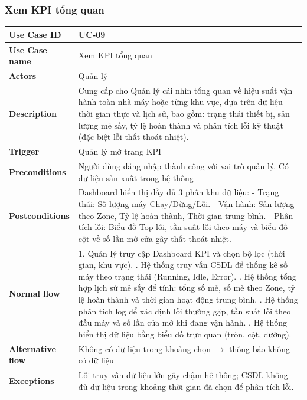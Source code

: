 \subsubsection{Xem KPI tổng quan}
\begin{tabular}{|p{3.5cm}|p{12.5cm}|}
\hline
\textbf{Use Case ID} & UC-09 \\
\hline
\textbf{Use Case name} & Xem KPI tổng quan \\
\hline
\textbf{Actors} & Quản lý \\
\hline
\textbf{Description} & 
Cung cấp cho Quản lý cái nhìn tổng quan về hiệu suất vận hành toàn nhà máy hoặc từng khu vực, dựa trên dữ liệu thời gian thực và lịch sử, bao gồm: trạng thái thiết bị, sản lượng mẻ sấy, tỷ lệ hoàn thành và phân tích lỗi kỹ thuật (đặc biệt lỗi thất thoát nhiệt). \\
\hline
\textbf{Trigger} & Quản lý mở trang KPI \\
\hline
\textbf{Preconditions} & Người dùng đăng nhập thành công với vai trò quản lý. Có dữ liệu sản xuất trong hệ thống \\
\hline
\textbf{Postconditions} & Dashboard hiển thị đầy đủ 3 phân khu dữ liệu:\newline
\hspace{1cm} - Trạng thái: Số lượng máy Chạy/Dừng/Lỗi.\newline
\hspace{1cm} - Vận hành: Sản lượng theo Zone, Tỷ lệ hoàn thành, Thời gian trung bình.\newline
\hspace{1cm}  - Phân tích lỗi: Biểu đồ Top lỗi, tần suất lỗi theo máy và biểu đồ cột về số lần mở cửa gây thất thoát nhiệt. \\
\hline
\textbf{Normal flow} & 
1. Quản lý truy cập Dashboard KPI và chọn bộ lọc (thời gian, khu vực). \newline
2. Hệ thống truy vấn CSDL để thống kê số máy theo trạng thái (Running, Idle, Error). \newline
3. Hệ thống tổng hợp lịch sử mẻ sấy để tính: tổng số mẻ, số mẻ theo Zone, tỷ lệ hoàn thành và thời gian hoạt động trung bình. \newline
4. Hệ thống phân tích log để xác định lỗi thường gặp, tần suất lỗi theo đầu máy và số lần cửa mở khi đang vận hành. \newline
5. Hệ thống hiển thị dữ liệu bằng biểu đồ trực quan (tròn, cột, đường). \\
\hline
\textbf{Alternative flow} & 
Không có dữ liệu trong khoảng chọn $\rightarrow$ thông báo không có dữ liệu \\
\hline
\textbf{Exceptions} & Lỗi truy vấn dữ liệu lớn gây chậm hệ thống; CSDL không đủ dữ liệu trong khoảng thời gian đã chọn để phân tích lỗi. \\
\hline
\end{tabular}

